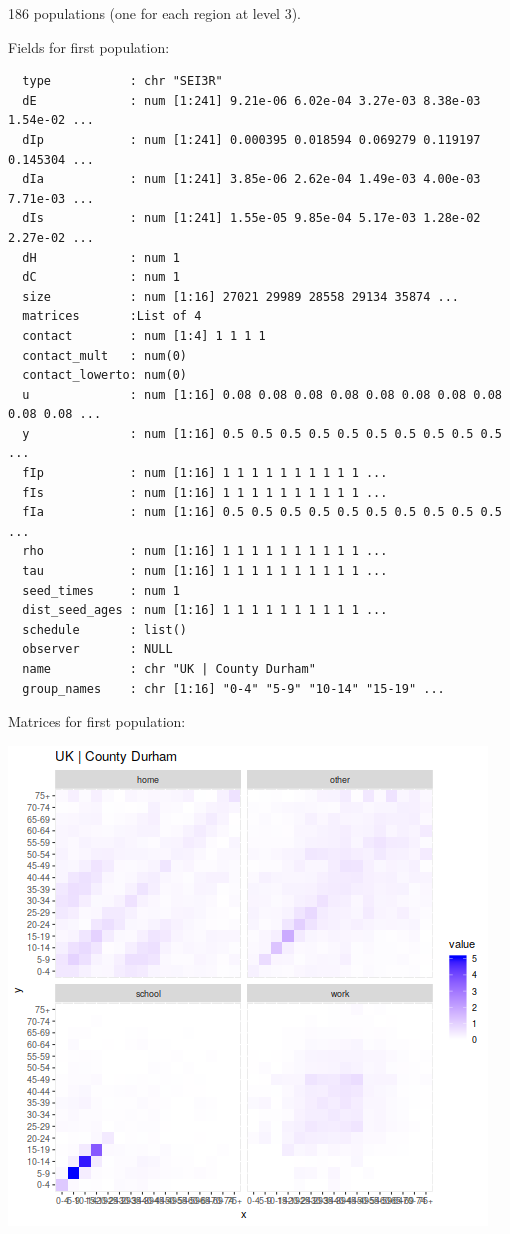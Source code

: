 \documentclass[11pt]{article}
\begin{document}
186 populations (one for each region at level 3).

Fields for first population:
\begin{verbatim}
  type           : chr "SEI3R"
  dE             : num [1:241] 9.21e-06 6.02e-04 3.27e-03 8.38e-03 1.54e-02 ...
  dIp            : num [1:241] 0.000395 0.018594 0.069279 0.119197 0.145304 ...
  dIa            : num [1:241] 3.85e-06 2.62e-04 1.49e-03 4.00e-03 7.71e-03 ...
  dIs            : num [1:241] 1.55e-05 9.85e-04 5.17e-03 1.28e-02 2.27e-02 ...
  dH             : num 1
  dC             : num 1
  size           : num [1:16] 27021 29989 28558 29134 35874 ...
  matrices       :List of 4
  contact        : num [1:4] 1 1 1 1
  contact_mult   : num(0) 
  contact_lowerto: num(0) 
  u              : num [1:16] 0.08 0.08 0.08 0.08 0.08 0.08 0.08 0.08 0.08 0.08 ...
  y              : num [1:16] 0.5 0.5 0.5 0.5 0.5 0.5 0.5 0.5 0.5 0.5 ...
  fIp            : num [1:16] 1 1 1 1 1 1 1 1 1 1 ...
  fIs            : num [1:16] 1 1 1 1 1 1 1 1 1 1 ...
  fIa            : num [1:16] 0.5 0.5 0.5 0.5 0.5 0.5 0.5 0.5 0.5 0.5 ...
  rho            : num [1:16] 1 1 1 1 1 1 1 1 1 1 ...
  tau            : num [1:16] 1 1 1 1 1 1 1 1 1 1 ...
  seed_times     : num 1
  dist_seed_ages : num [1:16] 1 1 1 1 1 1 1 1 1 1 ...
  schedule       : list()
  observer       : NULL
  name           : chr "UK | County Durham"
  group_names    : chr [1:16] "0-4" "5-9" "10-14" "15-19" ...
\end{verbatim}

Matrices for first population:
\begin{center}
\includegraphics[width=.9\linewidth]{1-home-parameters.png}
\end{center}
\end{document}
